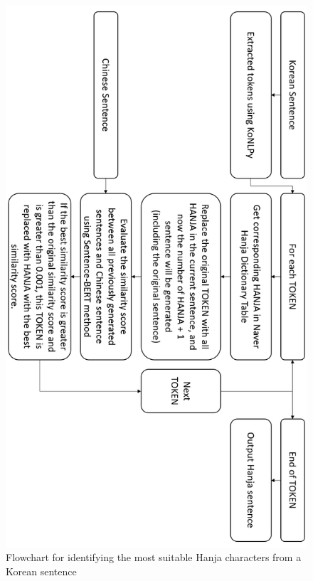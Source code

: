 \documentclass[PhD]{PHlab-thesis}
\begin{document}
\clearpage
\begin{figure}[h!]
  \centering
  \includegraphics[width=0.75\linewidth]{fig_3_6.jpg}
  \captionsetup{type=figure}
  \caption{Flowchart for identifying the most suitable Hanja characters from a Korean sentence}
  \label{fig:flowchar_hanja}
\end{figure}
\end{document}
